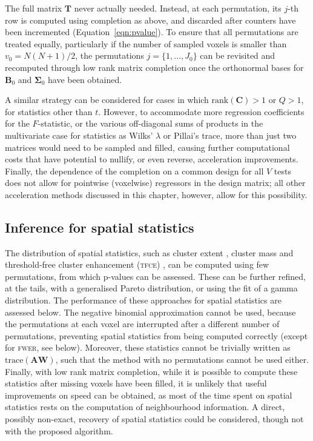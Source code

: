 The full matrix $\mathbf{T}$ never actually needed. Instead, at each permutation, its $j$-th row is computed using completion as above, and discarded after counters have been incremented (Equation~\ref{eqn:pvalue}). To ensure that all permutations are treated equally, particularly if the number of sampled voxels is smaller than  $v_0 = N(N+1)/2$, the permutations $j=\{1,\ldots,J_0\}$ can be revisited and recomputed through low rank matrix completion once the orthonormal bases for $\mathbf{B}_0$ and $\boldsymbol{\Sigma}_0$ have been obtained.

A similar strategy can be considered for cases in which $\text{rank}(\mathbf{C}) > 1$ or $Q>1$, for statistics other than $t$. However, to accommodate more regression coefficients for the $F$-statistic, or the various off-diagonal sums of products in the multivariate case for statistics as Wilks' $\lambda$ or Pillai's trace, more than just two matrices would need to be sampled and filled, causing further computational costs that have potential to nullify, or even reverse, acceleration improvements. Finally, the dependence of the completion on a common design for all $V$ tests does not allow for pointwise (voxelwise) regressors in the design matrix; all other acceleration methods discussed in this chapter, however, allow for this possibility.

\subsection{Inference for spatial statistics}
\label{sec:accel:spatial}

The distribution of spatial statistics, such as cluster extent \citep{Friston1994}, cluster mass \citep{Poline1997, Bullmore1999} and threshold-free cluster enhancement (\textsc{tfce}) \citep{Smith2009}, can be computed using few permutations, from which p-values can be assessed. These can be further refined, at the tails, with a generalised Pareto distribution, or using the fit of a gamma distribution. The performance of these approaches for spatial statistics are assessed below. The negative binomial approximation cannot be used, because the permutations at each voxel are interrupted after a different number of permutations, preventing spatial statistics from being computed correctly (except for \textsc{fwer}, see below). Moreover, these statistics cannot be trivially written as $\text{trace}(\mathbf{A}\mathbf{W})$, such that the method with no permutations cannot be used either. Finally, with low rank matrix completion, while it is possible to compute these statistics after missing voxels have been filled, it is unlikely that useful improvements on speed can be obtained, as most of the time spent on spatial statistics rests on the computation of neighbourhood information. A direct, possibly non-exact, recovery of spatial statistics could be considered, though not with the proposed algorithm.

